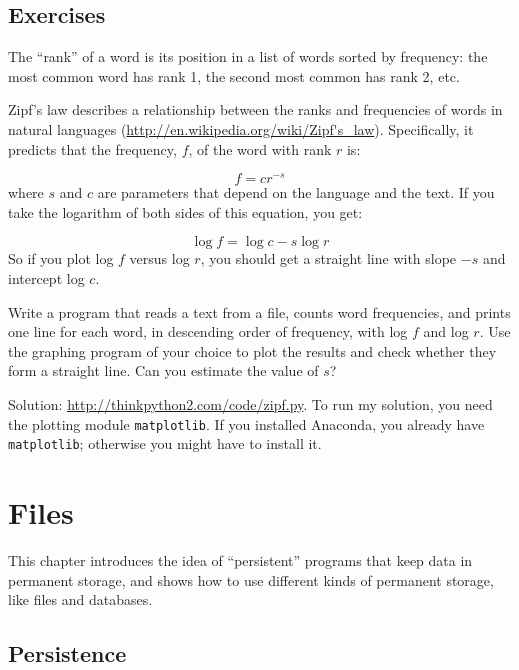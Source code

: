 \documentclass[10pt]{book}
\begin{document}
\section{Exercises}

\begin{exercise}

The ``rank'' of a word is its position in a list of words
sorted by frequency: the most common word has rank 1, the
second most common has rank 2, etc.

Zipf's law describes a relationship between the ranks and frequencies
of words in natural languages
(\url{http://en.wikipedia.org/wiki/Zipf's_law}).  Specifically, it
predicts that the frequency, $f$, of the word with rank $r$ is:

\[ f = c r^{-s} \]
%
where $s$ and $c$ are parameters that depend on the language and the
text.  If you take the logarithm of both sides of this equation, you
get:

\[ \log f = \log c - s \log r \]
%
So if you plot log $f$ versus log $r$, you should get
a straight line with slope $-s$ and intercept log $c$.

Write a program that reads a text from a file, counts
word frequencies, and prints one line
for each word, in descending order of frequency, with
log $f$ and log $r$.  Use the graphing program of your
choice to plot the results and check whether they form
a straight line.  Can you estimate the value of $s$?

Solution: \url{http://thinkpython2.com/code/zipf.py}.
To run my solution, you need the plotting module {\tt matplotlib}.
If you installed Anaconda, you already have {\tt matplotlib};
otherwise you might have to install it.

\end{exercise}



\chapter{Files}

This chapter introduces the idea of ``persistent'' programs that
keep data in permanent storage, and shows how to use different
kinds of permanent storage, like files and databases.


\section{Persistence}
\end{document}
